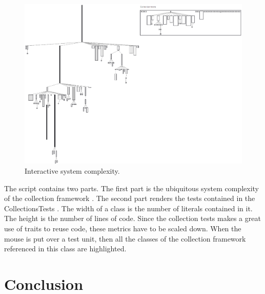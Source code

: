 \documentclass[a4paper,10pt,twoside]{book}
\begin{document}
\begin{figure}[htbp]
\centerline{\includegraphics[width=\linewidth]{testCoverage.png}}
\caption{Interactive system complexity.}
\label{fig:interactiveTestCoverage}
\end{figure}


The script contains two parts. The first part is the ubiquitous system complexity of the collection framework .  The second part renders the tests contained in the CollectionsTests . The width of a class is the number of literals contained in it. The height is the number of lines of code. Since the collection tests makes a great use of traits to reuse code, these metrics have to be scaled down. When the mouse is put over a test unit, then all the classes of the collection framework referenced in this class are highlighted. 


\section{Conclusion}
\end{document}
